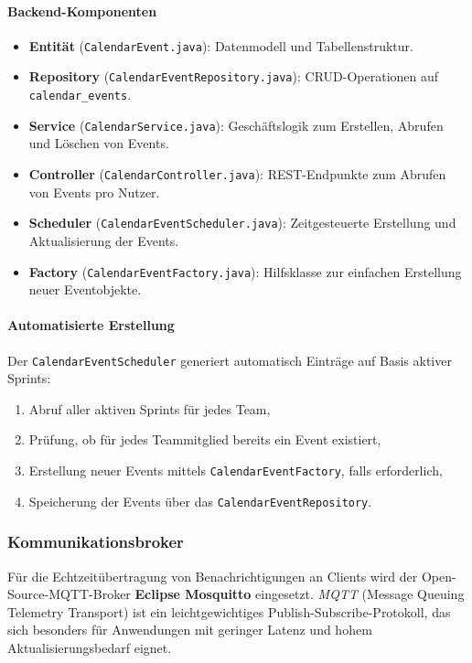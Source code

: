 \documentclass[12pt,a4paper]{report}
\begin{document}
\paragraph{Backend-Komponenten}
\begin{itemize}
  \item \textbf{Entität} (\texttt{CalendarEvent.java}): Datenmodell und Tabellenstruktur.
  \item \textbf{Repository} (\texttt{CalendarEventRepository.java}): CRUD-Operationen auf \texttt{calendar\_events}.
  \item \textbf{Service} (\texttt{CalendarService.java}): Geschäftslogik zum Erstellen, Abrufen und Löschen von Events.
  \item \textbf{Controller} (\texttt{CalendarController.java}): REST-Endpunkte zum Abrufen von Events pro Nutzer.
  \item \textbf{Scheduler} (\texttt{CalendarEventScheduler.java}): Zeitgesteuerte Erstellung und Aktualisierung der Events.
  \item \textbf{Factory} (\texttt{CalendarEventFactory.java}): Hilfsklasse zur einfachen Erstellung neuer Eventobjekte.
\end{itemize}

\paragraph{Automatisierte Erstellung}
Der \texttt{CalendarEventScheduler} generiert automatisch Einträge auf Basis aktiver Sprints:
\begin{enumerate}
  \item Abruf aller aktiven Sprints für jedes Team,
  \item Prüfung, ob für jedes Teammitglied bereits ein Event existiert,
  \item Erstellung neuer Events mittels \texttt{CalendarEventFactory}, falls erforderlich,
  \item Speicherung der Events über das \texttt{CalendarEventRepository}.
\end{enumerate}

\subsubsection{Kommunikationsbroker}

Für die Echtzeitübertragung von Benachrichtigungen an Clients wird der Open-Source-MQTT-Broker \textbf{Eclipse Mosquitto} eingesetzt.
\textit{MQTT} (Message Queuing Telemetry Transport) ist ein leichtgewichtiges Publish-Subscribe-Protokoll, das sich besonders für Anwendungen mit geringer Latenz und hohem Aktualisierungsbedarf eignet.
\end{document}
